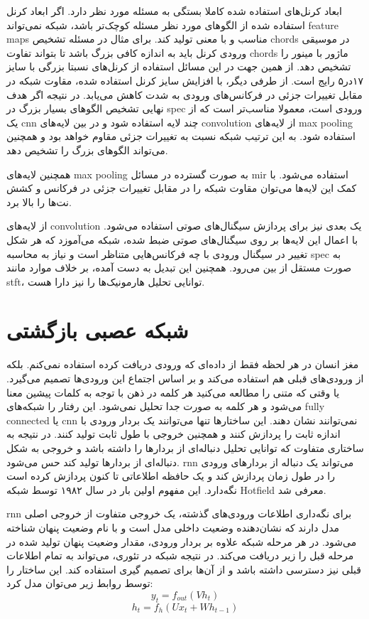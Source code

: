 ابعاد کرنل‌های استفاده شده کاملا بستگی به مسئله مورد نظر دارد. اگر ابعاد کرنل
استفاده شده از الگوهای مورد نظر مسئله کوچک‌تر باشد، شبکه نمی‌تواند
\glspl{feature map} مناسب و با معنی تولید کند. برای مثال در مسئله تشخیص
\glspl{chord} در موسیقی ورودی کرنل باید به اندازه کافی بزرگ باشد تا بتواند تفاوت
\glspl{chord} ماژور با مینور را تشخیص دهد. از همین جهت در این مسائل استفاده از
کرنل‌های نسبتا بزرگی با سایز ۱۷در۵ رایج است. از طرفی دیگر، با افزایش سایز کرنل
استفاده شده، مقاوت شبکه در مقابل تغییرات جزئی در فرکانس‌های ورودی به شدت کاهش
می‌یابد. در نتیجه اگر هدف نهایی تشخیص الگوهای بسیار بزرگ در \gls{spec} ورودی
است، معمولا مناسب‌تر است که از یک \gls{cnn} چند لایه استفاده شود و در بین
لایه‌های \gls{convolution} از لایه‌های \gls{max pooling} استفاده شود. به این
ترتیب شبکه نسبت به تغییرات جزئی مقاوم خواهد بود و همچنین می‌تواند الگوهای بزرگ
را تشخیص دهد.

همچنین لایه‌های \gls{max pooling} به صورت گسترده در مسائل \gls{mir} استفاده
می‌شود. با کمک این لایه‌ها می‌توان مقاوت شبکه را در مقابل تغییرات جزئی در فرکانس
و کشش نت‌ها را بالا برد.

از لایه‌های \gls{convolution} یک بعدی نیز برای پردازش سیگنال‌های صوتی استفاده
می‌شود. با اعمال این لایه‌ها بر روی سیگنال‌های صوتی ضبط شده، شبکه می‌‌آموزد که
هر شکل تغییر در سیگنال ورودی با چه فرکانس‌هایی متناظر است و نیاز به محاسبه
\gls{spec} به صورت مستقل از بین می‌رود. همچنین این تبدیل به دست آمده، بر خلاف
موارد مانند \gls{stft}، توانایی تحلیل هارمونیک‌ها را نیز دارا هست.

\section{شبکه عصبی بازگشتی}
مغز انسان در هر لحظه فقط از داده‌ای که ورودی دریافت کرده استفاده نمی‌کنم. بلکه
از ورودی‌های قبلی هم استفاده می‌کند و بر اساس اجتماع این ورودی‌ها تصمیم می‌گیرد.
یا وقتی که متنی را مطالعه می‌کنید هر کلمه در ذهن با توجه به کلمات پیشین معنا
می‌شود و هر کلمه به صورت جدا تحلیل نمی‌شود. این رفتار را شبکه‌های \gls{fully
connected} یا \gls{cnn} نمی‌توانند نشان دهند. این ساختارها تنها می‌توانند یک
بردار ورودی با اندازه ثابت را پردازش کنند و همچنین خروجی با طول ثابت تولید کنند.
در نتیجه به ساختاری متفاوت که توانایی تحلیل دنباله‌ای از بردارها را داشته باشد و
خروجی به شکل دنباله‌ای از بردارها تولید کند حس می‌شود. \gls{rnn} می‌تواند یک
دنباله از بردارهای ورودی را در طول زمان پردازش کند و یک حافظه اطلاعاتی تا کنون
پردازش کرده است نگه‌دارد. این مفهوم اولین بار در سال ۱۹۸۲ توسط شبکه Hotfield
معرفی شد.

\gls{rnn} برای نگه‌داری اطلاعات ورودی‌های گذشته، یک خروجی متفاوت از خروجی اصلی
مدل دارند که نشان‌دهنده وضعیت داخلی مدل است و با نام وضعیت پنهان شناخته می‌شود.
در هر مرحله شبکه علاوه بر بردار ورودی، مقدار وضعیت پنهان تولید شده در مرحله قبل
را زیر دریافت می‌کند. در نتیجه شبکه در تئوری، می‌تواند به تمام اطلاعات قبلی نیز
دسترسی داشته باشد و از آن‌ها برای تصمیم گیری استفاده کند. این ساختار را توسط
روابط زیر می‌توان مدل کرد:
\begin{equation}
    y_t = f_{out}(Vh_t)
\end{equation}
\begin{equation}
    h_t = f_h(Ux_t + Wh_{t-1})
\end{equation}

